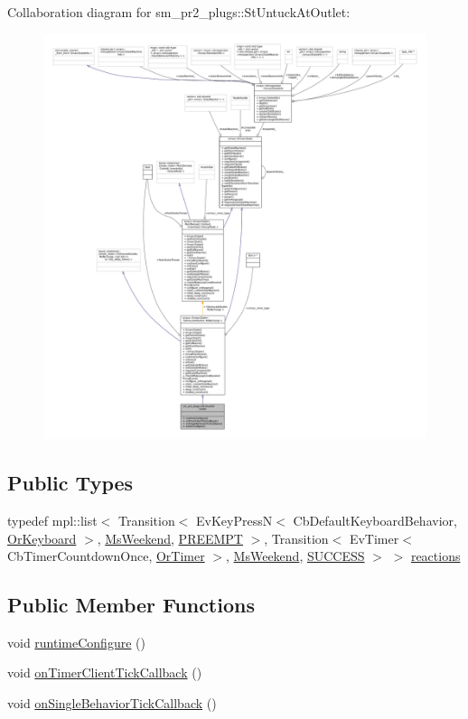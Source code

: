 Collaboration diagram for sm\+\_\+pr2\+\_\+plugs\+:\+:St\+Untuck\+At\+Outlet\+:
\nopagebreak
\begin{figure}[H]
\begin{center}
\leavevmode
\includegraphics[width=350pt]{structsm__pr2__plugs_1_1StUntuckAtOutlet__coll__graph}
\end{center}
\end{figure}
\subsection*{Public Types}
\begin{DoxyCompactItemize}
\item 
typedef mpl\+::list$<$ Transition$<$ Ev\+Key\+PressN$<$ Cb\+Default\+Keyboard\+Behavior, \hyperlink{classsm__pr2__plugs_1_1OrKeyboard}{Or\+Keyboard} $>$, \hyperlink{classsm__pr2__plugs_1_1MsWeekend}{Ms\+Weekend}, \hyperlink{classPREEMPT}{P\+R\+E\+E\+M\+PT} $>$, Transition$<$ Ev\+Timer$<$ Cb\+Timer\+Countdown\+Once, \hyperlink{classsm__pr2__plugs_1_1OrTimer}{Or\+Timer} $>$, \hyperlink{classsm__pr2__plugs_1_1MsWeekend}{Ms\+Weekend}, \hyperlink{classSUCCESS}{S\+U\+C\+C\+E\+SS} $>$ $>$ \hyperlink{structsm__pr2__plugs_1_1StUntuckAtOutlet_a1453a8b43c11a6ee63d2ea2484656f12}{reactions}
\end{DoxyCompactItemize}
\subsection*{Public Member Functions}
\begin{DoxyCompactItemize}
\item 
void \hyperlink{structsm__pr2__plugs_1_1StUntuckAtOutlet_a14d6ec782f8d78b6df0ef610508b0e9b}{runtime\+Configure} ()
\item 
void \hyperlink{structsm__pr2__plugs_1_1StUntuckAtOutlet_a51a908bc8b1908d8e548db64bc8a5528}{on\+Timer\+Client\+Tick\+Callback} ()
\item 
void \hyperlink{structsm__pr2__plugs_1_1StUntuckAtOutlet_a6a0c321350c11e8f393c34e7c85bf36a}{on\+Single\+Behavior\+Tick\+Callback} ()
\end{DoxyCompactItemize}
